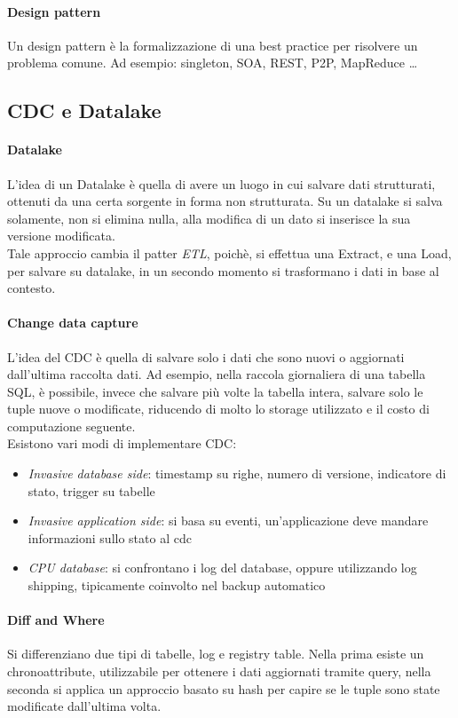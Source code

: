 \paragraph{Design pattern}
Un design pattern è la formalizzazione di una best practice per risolvere un
problema comune.
Ad esempio: singleton, SOA, REST, P2P, MapReduce \dots

\subsection{CDC e Datalake}

\paragraph{Datalake}
L'idea di un Datalake è quella di avere un luogo in cui salvare dati strutturati, 
ottenuti da una certa sorgente in forma non strutturata. Su un datalake si salva 
solamente, non si elimina nulla, alla modifica di un dato si inserisce la sua versione modificata.\\
Tale approccio cambia il patter \emph{ETL}, poichè, si effettua una Extract, e una 
Load, per salvare su datalake, in un secondo momento si trasformano i dati in base 
al contesto.

\paragraph{Change data capture}
L'idea del CDC è quella di salvare solo i dati che sono nuovi o aggiornati dall'ultima
raccolta dati. Ad esempio, nella raccola giornaliera di una tabella SQL, è possibile, 
invece che salvare più volte la tabella intera, salvare solo le tuple nuove o 
modificate, riducendo di molto lo storage utilizzato e il costo di computazione 
seguente.\\
Esistono vari modi di implementare CDC:
\begin{itemize}
    \item \emph{Invasive database side}: timestamp su righe, numero di versione, 
    indicatore di stato, trigger su tabelle
    \item \emph{Invasive application side}: si basa su eventi, un'applicazione deve mandare informazioni sullo stato al cdc 
    \item \emph{CPU database}: si confrontano i log del database, oppure utilizzando log shipping, tipicamente coinvolto nel backup automatico
\end{itemize}

\paragraph{Diff and Where}
Si differenziano due tipi di tabelle, log e registry table.
Nella prima esiste un chronoattribute, utilizzabile per ottenere i dati aggiornati 
tramite query, nella seconda si applica un approccio basato su hash per capire 
se le tuple sono state modificate dall'ultima volta.

